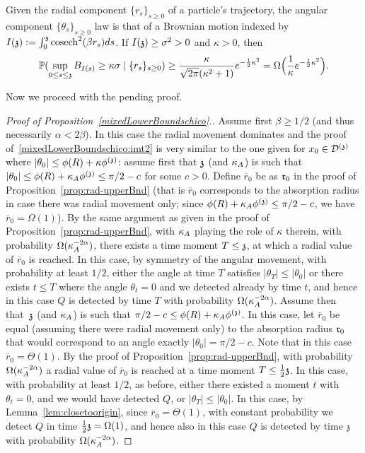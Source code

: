 \begin{fact}\label{mixedLower:fact:brownian}
Given the radial component $\{r_{s}\}_{s\geq 0}$ of a particle's trajectory,  the angular component $\{\theta_s\}_{s\geq 0}$ law is that of a Brownian motion indexed by $\II{\ss}:=\int_0^{\ss}\cosech^2(\beta r_s)ds$. 
If $\II{\ss} \ge \sigma^2 > 0$ and $\kappa>0$, then 
\[
\PP(\sup_{0\leq s\leq \ss} B_{\II{s}}\geq \kappa \sigma \mid \{r_s\}_{s\geq 0}) \geq  \frac{\kappa}{\sqrt{2\pi}(\kappa^2+1)}e^{-\frac12\kappa^2}=\Omega\Big(\frac{1}{\kappa}e^{-\frac12\kappa^2}\Big).
\]
\end{fact}
Now we proceed with the pending proof.
\begin{proof}[Proof of Proposition~\ref{mixedLowerBoundschico}.]
Assume first $\beta \ge 1/2$
(and thus necessarily $\alpha < 2\beta$). In this case the radial movement dominates and the proof of~\eqref{mixedLowerBoundschico:imt2} is very similar to the one given for $x_0 \in \dt$ where $|\theta_0|\le \phi(R)+\kappa\phis$: assume first that $\ss$ (and $\KA$) is such that $|\theta_0|\le \phi(R)+\KA \phis \le \pi/2 - c$ for some $c > 0$. Define $\overline{r}_0$ be as $\rabs_0$ in the proof of Proposition~\ref{prop:rad-upperBnd} (that is $\overline{r}_0$ corresponds to the absorption radius in case there was radial movement only; since $\phi(R)+\KA \phis \le \pi/2 - c$, we have $\overline{r}_0=\Omega(1)$). By the same argument as given in the proof of Proposition~\ref{prop:rad-upperBnd}, with $\KA$ playing the role of $\kappa$ therein, with probability $\Omega(\KA^{-2\alpha})$, there exists a time moment $T \le \ss$, at which a radial value of $\overline{r}_0$ is reached. In this case, by symmetry of the angular movement, with probability at least $1/2$, either the angle at time $T$ satisfies $|\theta_T| \le |\theta_0|$ or there exists $t \le T$ where the angle $\theta_t=0$ and we detected already by time $t$, and hence in this case $Q$ is detected by time $T$ with probability $\Omega(\KA^{-2\alpha})$. Assume then that~$\ss$ (and $\KA$) is such that $\pi/2 - c \le \phi(R)+\KA \phis$. In this case, let $\overline{r}_0$ be equal  (assuming there were radial movement only) to the absorption radius $\rabs_0$ that would correspond to an angle exactly $|\theta_0|=\pi/2 -c$. Note that in this case $\overline{r}_0=\Theta(1)$. By the proof of Proposition~\ref{prop:rad-upperBnd}, with probability $\Omega(\KA^{-2\alpha})$ a radial value of $\overline{r}_0$ is reached at a time moment  $T \le \frac12\ss$. In this case, with probability at least $1/2$, as before, either there existed a moment $t$ with $\theta_t=0$, and we would have detected $Q$, or $|\theta_T|\le|\theta_0|$. In this case, by Lemma~\ref{lem:closetoorigin}, since $\overline{r}_0=\Theta(1)$, with constant probability we detect $Q$ in time $\frac12\ss=\Omega(1)$, and hence also in this case $Q$ is detected by time $\ss$ with probability $\Omega(\KA^{-2\alpha})$.



\end{proof}

